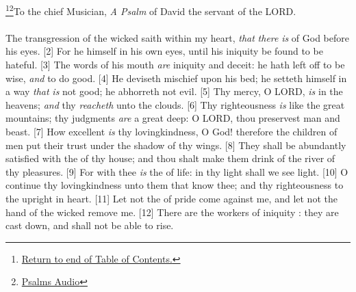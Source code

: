\footnote{\textcolor[cmyk]{0.99998,1,0,0}{\hyperlink{TOC}{Return to end of Table of Contents.}}}\footnote{\href{https://www.audioverse.org/english/audiobibles/books/ENGKJV/O/Ps/1}{\textcolor[cmyk]{0.99998,1,0,0}{Psalms Audio}}}\textcolor[cmyk]{0.99998,1,0,0}{To the chief Musician, \emph{A Psalm} of David the servant of the LORD.}\\
\\
\textcolor[cmyk]{0.99998,1,0,0}{The transgression of the wicked saith within my heart, \emph{that} \emph{there} \emph{is}  of God before his eyes.}
[2] \textcolor[cmyk]{0.99998,1,0,0}{For he  himself in his own eyes, until his iniquity be found to be hateful.}
[3] \textcolor[cmyk]{0.99998,1,0,0}{The words of his mouth \emph{are} iniquity and deceit: he hath left off to be wise, \emph{and} to do good.}
[4] \textcolor[cmyk]{0.99998,1,0,0}{He deviseth mischief upon his bed; he setteth himself in a way \emph{that} \emph{is} not good; he abhorreth not evil.}
[5] \textcolor[cmyk]{0.99998,1,0,0}{Thy mercy, O LORD, \emph{is} in the heavens; \emph{and} thy  \emph{reacheth} unto the clouds.}
[6] \textcolor[cmyk]{0.99998,1,0,0}{Thy righteousness \emph{is} like the great mountains; thy judgments \emph{are} a great deep: O LORD, thou preservest man and beast.}
[7] \textcolor[cmyk]{0.99998,1,0,0}{How excellent \emph{is} thy lovingkindness, O God! therefore the children of men put their trust under the shadow of thy wings.}
[8] \textcolor[cmyk]{0.99998,1,0,0}{They shall be abundantly satisfied with the  of thy house; and thou shalt make them drink of the river of thy pleasures.}
[9] \textcolor[cmyk]{0.99998,1,0,0}{For with thee \emph{is} the  of life: in thy light shall we see light.}
[10] \textcolor[cmyk]{0.99998,1,0,0}{O continue thy lovingkindness unto them that know thee; and thy righteousness to the upright in heart.}
[11] \textcolor[cmyk]{0.99998,1,0,0}{Let not the  of pride come against me, and let not the hand of the wicked remove me.}
[12] \textcolor[cmyk]{0.99998,1,0,0}{There are the workers of iniquity : they are cast down, and shall not be able to rise.}





